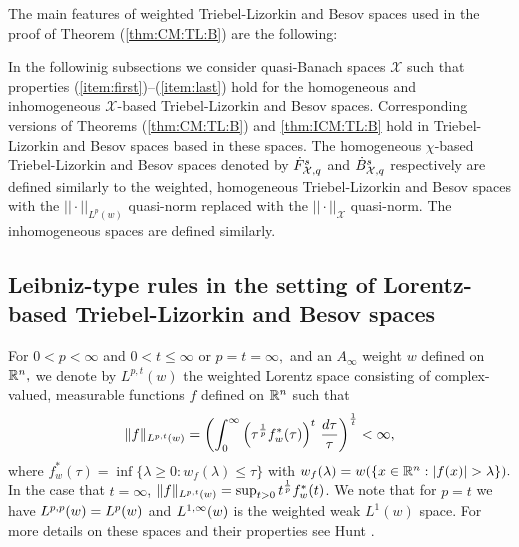 The main features of weighted Triebel-Lizorkin and Besov spaces used in the proof of Theorem (\ref{thm:CM:TL:B}) are the following:

In the followinig subsections we consider quasi-Banach spaces $\mathcal{X}$ such that properties (\ref{item:first})--(\ref{item:last}) hold for the homogeneous and inhomogeneous $\mathcal{X}$-based Triebel-Lizorkin and Besov spaces. Corresponding versions of Theorems (\ref{thm:CM:TL:B}) and \ref{thm:ICM:TL:B} hold in Triebel-Lizorkin and Besov spaces based in these spaces. The homogeneous $\chi$-based Triebel-Lizorkin and Besov spaces denoted by $\tl{\mathcal{X}}{s}{q}$ and $\bes{\mathcal{X}}{s}{q}$ respectively are defined similarly to the weighted, homogeneous Triebel-Lizorkin and Besov spaces with the $||\cdot||_{L^p(w)}$ quasi-norm replaced with the $||\cdot||_\mathcal{X}$ quasi-norm. The inhomogeneous spaces are defined similarly. 

 \subsection{Leibniz-type rules in the setting of Lorentz-based Triebel-Lizorkin and Besov spaces}
 For $0<p<\infty$ and $0<t\le \infty$ or $p=t=\infty,$ and an $A_\infty$ weight $w$ defined on $\rn,$  we denote by $L^{p,t}(w)$ the weighted Lorentz space consisting of complex-valued, measurable functions $f$ defined on $\rn$ such that
\[
\|f\|_{\lebw{p,t}{w}}=\left(\int_0^\infty \left(\tau^{\frac{1}{p}} f_w^*(\tau)\right)^t\,\frac{d\tau}{\tau}\right)^{\frac{1}{t}}<\infty,
\]
where $f^*_w(\tau)=\inf\{\lambda\ge 0:w_f(\lambda)\le \tau\}$ with
$w_f(\lambda)=w(\{x\in\rn : \abs{f(x)}>\lambda\}).$ 
In the case that $t=\infty$, $\|f\|_{\lebw{p,t}{w}}= \sup_{t>0}t^{\frac{1}{p}}f_w^*(t)$. We note that for $p=t$ we have $\lebw{p,p}{w} = \lebw{p}{w}$ and $\lebw{1,\infty}{w}$ is the weighted weak $L^1(w)$ space. For more details on these spaces and their properties see Hunt \cite{MR0223874}. 

